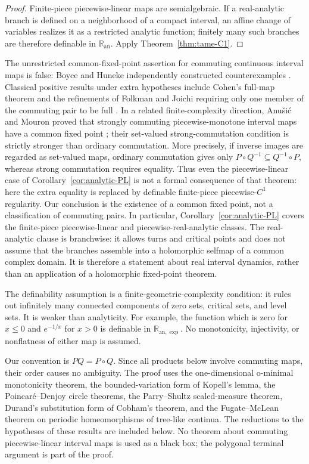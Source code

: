 \documentclass[11pt]{article}
\theoremstyle{definition}
\theoremstyle{remark}
\begin{document}
\begin{proof}
Finite-piece piecewise-linear maps are semialgebraic.  If a real-analytic
branch is defined on a neighborhood of a compact interval, an affine change
of variables realizes it as a restricted analytic function; finitely many
such branches are therefore definable in $\mathbb R_{\mathrm{an}}$.  Apply
Theorem~\ref{thm:tame-C1}.
\end{proof}

The unrestricted common-fixed-point assertion for commuting continuous
interval maps is false: Boyce and Huneke independently constructed
counterexamples \cite{Boyce,Huneke}.  Classical positive results under
extra hypotheses include Cohen's full-map theorem and the refinements of
Folkman and Joichi requiring only one member of the commuting pair to be
full \cite{Cohen,Folkman,Joichi}.  In a related finite-complexity direction,
Anu\v{s}i\'c and Mouron proved that strongly commuting piecewise-monotone
interval maps have a common fixed point \cite{AnusicMouron}; their
set-valued strong-commutation condition is strictly stronger than ordinary
commutation.  More precisely, if inverse images are regarded as set-valued
maps, ordinary commutation gives only
\(P\circ Q^{-1}\subseteq Q^{-1}\circ P\), whereas strong commutation requires
equality.  Thus even the piecewise-linear case of
Corollary~\ref{cor:analytic-PL} is not a formal consequence of that theorem:
here the extra equality is replaced by definable finite-piece
piecewise-\(C^1\) regularity.  Our conclusion is the existence of a common
fixed point, not a classification of commuting pairs.  In particular,
Corollary~\ref{cor:analytic-PL} covers the finite-piece piecewise-linear and
piecewise-real-analytic classes.
The real-analytic clause is branchwise: it allows turns and critical points
and does not assume that the branches assemble into a holomorphic selfmap
of a common complex domain.  It is therefore a statement about real
interval dynamics, rather than an application of a holomorphic fixed-point
theorem.

The definability assumption is a finite-geometric-complexity condition: it
rules out infinitely many connected components of zero sets, critical sets,
and level sets.  It is weaker than analyticity.  For example, the function
which is zero for $x\leq0$ and $e^{-1/x}$ for $x>0$ is definable in
$\mathbb R_{\mathrm{an},\exp}$.  No monotonicity, injectivity, or
nonflatness of either map is assumed.

Our convention is \(PQ=P\circ Q\).  Since all products below involve
commuting maps, their order causes no ambiguity.  The proof uses the
one-dimensional o-minimal monotonicity theorem, the bounded-variation form of
Kopell's lemma, the Poincar\'e--Denjoy circle theorems, the
Parry--Shultz scaled-measure theorem, Durand's substitution form of Cobham's
theorem, and the Fugate--McLean theorem on periodic homeomorphisms of
tree-like continua.  The reductions to the hypotheses of these results are
included below.  No theorem about commuting piecewise-linear interval maps is
used as a black box; the polygonal terminal argument is part of the proof.
\end{document}
